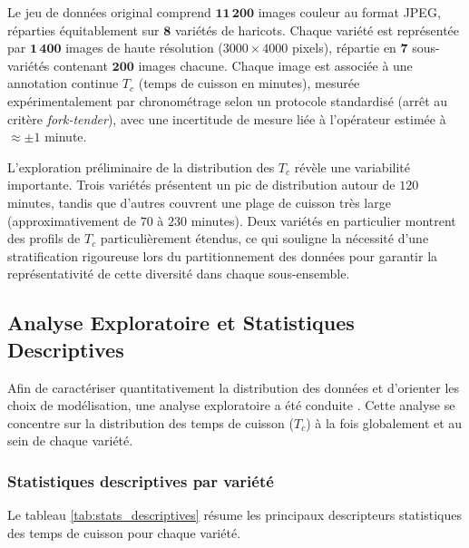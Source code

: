 Le jeu de données original comprend \(\mathbf{11\,200}\) images couleur au format JPEG, réparties équitablement sur \(\mathbf{8}\) variétés de haricots. Chaque variété est représentée par \(\mathbf{1\,400}\) images de haute résolution (\(3000\times4000\) pixels), répartie en \(\mathbf{7}\) sous-variétés contenant \(\mathbf{200}\) images chacune. Chaque image est associée à une annotation continue \(T_c\) (temps de cuisson en minutes), mesurée expérimentalement par chronométrage selon un protocole standardisé (arrêt au critère \emph{fork-tender}), avec une incertitude de mesure liée à l'opérateur estimée à \(\approx\pm 1\) minute.

L’exploration préliminaire de la distribution des $T_c$ révèle une variabilité importante. Trois variétés présentent un pic de distribution autour de $120$ minutes, tandis que d'autres couvrent une plage de cuisson très large (approximativement de $70$ à $230$ minutes). Deux variétés en particulier montrent des profils de $T_c$ particulièrement étendus, ce qui souligne la nécessité d'une stratification rigoureuse lors du partitionnement des données pour garantir la représentativité de cette diversité dans chaque sous-ensemble.


\subsection{Analyse Exploratoire et Statistiques Descriptives}

Afin de caractériser quantitativement la distribution des données et d'orienter les choix de modélisation, une analyse exploratoire a été conduite \cite{tukey1977}. Cette analyse se concentre sur la distribution des temps de cuisson ($T_c$) à la fois globalement et au sein de chaque variété.

\subsubsection{Statistiques descriptives par variété}

Le tableau \ref{tab:stats_descriptives} résume les principaux descripteurs statistiques des temps de cuisson pour chaque variété.

